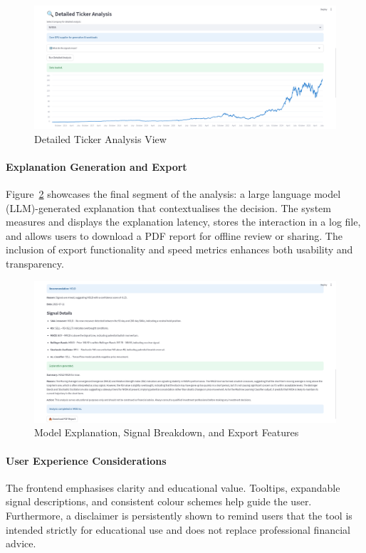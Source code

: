 \begin{figure}[h]
\centering
\includegraphics[width=0.9\linewidth]{assets/ui2-ticker_analysis.png}
\caption{Detailed Ticker Analysis View}
\label{fig:ui_detailed}
\end{figure}

\paragraph{Explanation Generation and Export}
Figure~\ref{fig:ui_explanation} showcases the final segment of the analysis: a large language model (LLM)-generated explanation that contextualises the decision. The system measures and displays the explanation latency, stores the interaction in a log file, and allows users to download a PDF report for offline review or sharing. The inclusion of export functionality and speed metrics enhances both usability and transparency.

\begin{figure}[h]
\centering
\includegraphics[width=0.9\linewidth]{assets/ui3-explanation.png}
\caption{Model Explanation, Signal Breakdown, and Export Features}
\label{fig:ui_explanation}
\end{figure}

\FloatBarrier

\paragraph{User Experience Considerations}
The frontend emphasises clarity and educational value. Tooltips, expandable signal descriptions, and consistent colour schemes help guide the user. Furthermore, a disclaimer is persistently shown to remind users that the tool is intended strictly for educational use and does not replace professional financial advice.

